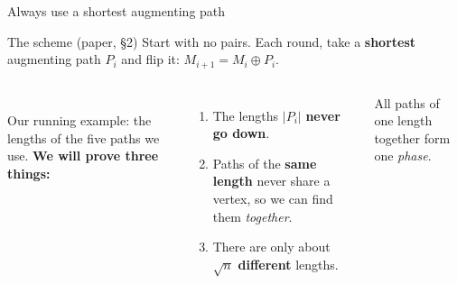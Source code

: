\documentclass[aspectratio=169,11pt]{beamer}
\newcommand{\curspk}{Viswanadha Bhanu Sriharsha}
\newcommand{\curpart}{Problem}
\begin{document}
\renewcommand{\curspk}{Aman Pathak}
\renewcommand{\curpart}{III. Shortest paths and phases}
\begin{frame}{Always use a shortest augmenting path}
\par\vspace{0mm}
\begin{block}{The scheme (paper, \S2)}
Start with no pairs. Each round, take a \textbf{shortest} augmenting path $P_i$ and flip it: $M_{i+1}=M_i\oplus P_i$.
\end{block}
\begin{columns}[c]
\centering
{}\\[-1mm]
{\footnotesize Our running example: the lengths of the five paths we use.}
\small\textbf{We will prove three things:}
\begin{enumerate}\setlength\itemsep{3pt}
  \item The lengths $|P_i|$ \textbf{never go down}.
  \item Paths of the \textbf{same length} never share a vertex, so we can find them \emph{together}.
  \item There are only about $\sqrt n$ \textbf{different} lengths.
\end{enumerate}
\textcolor{hkred}{All paths of one length together form one \emph{phase}.}
\end{columns}
\end{frame}
\end{document}
